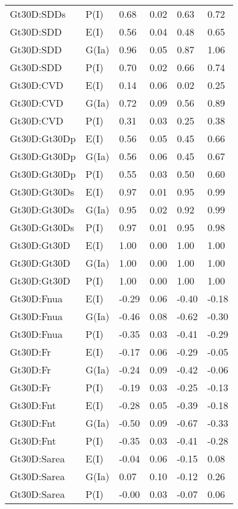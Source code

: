 \begin{center}
\begin{longtable}{|p{1.1in}|p{0.7in}|p{0.7in}|p{0.6in}|p{0.6in}|p{0.6in}|}
  Gt30D:SDDs & P(I) & 0.68 & 0.02 & 0.63 & 0.72 \\ 
  Gt30D:SDD & E(I) & 0.56 & 0.04 & 0.48 & 0.65 \\ 
  Gt30D:SDD & G(Ia) & 0.96 & 0.05 & 0.87 & 1.06 \\ 
  Gt30D:SDD & P(I) & 0.70 & 0.02 & 0.66 & 0.74 \\ 
  Gt30D:CVD & E(I) & 0.14 & 0.06 & 0.02 & 0.25 \\ 
  Gt30D:CVD & G(Ia) & 0.72 & 0.09 & 0.56 & 0.89 \\ 
  Gt30D:CVD & P(I) & 0.31 & 0.03 & 0.25 & 0.38 \\ 
  Gt30D:Gt30Dp & E(I) & 0.56 & 0.05 & 0.45 & 0.66 \\ 
  Gt30D:Gt30Dp & G(Ia) & 0.56 & 0.06 & 0.45 & 0.67 \\ 
  Gt30D:Gt30Dp & P(I) & 0.55 & 0.03 & 0.50 & 0.60 \\ 
  Gt30D:Gt30Ds & E(I) & 0.97 & 0.01 & 0.95 & 0.99 \\ 
  Gt30D:Gt30Ds & G(Ia) & 0.95 & 0.02 & 0.92 & 0.99 \\ 
  Gt30D:Gt30Ds & P(I) & 0.97 & 0.01 & 0.95 & 0.98 \\ 
  Gt30D:Gt30D & E(I) & 1.00 & 0.00 & 1.00 & 1.00 \\ 
  Gt30D:Gt30D & G(Ia) & 1.00 & 0.00 & 1.00 & 1.00 \\ 
  Gt30D:Gt30D & P(I) & 1.00 & 0.00 & 1.00 & 1.00 \\ 
  Gt30D:Fnua & E(I) & -0.29 & 0.06 & -0.40 & -0.18 \\ 
  Gt30D:Fnua & G(Ia) & -0.46 & 0.08 & -0.62 & -0.30 \\ 
  Gt30D:Fnua & P(I) & -0.35 & 0.03 & -0.41 & -0.29 \\ 
  Gt30D:Fr & E(I) & -0.17 & 0.06 & -0.29 & -0.05 \\ 
  Gt30D:Fr & G(Ia) & -0.24 & 0.09 & -0.42 & -0.06 \\ 
  Gt30D:Fr & P(I) & -0.19 & 0.03 & -0.25 & -0.13 \\ 
  Gt30D:Fnt & E(I) & -0.28 & 0.05 & -0.39 & -0.18 \\ 
  Gt30D:Fnt & G(Ia) & -0.50 & 0.09 & -0.67 & -0.33 \\ 
  Gt30D:Fnt & P(I) & -0.35 & 0.03 & -0.41 & -0.28 \\ 
  Gt30D:Sarea & E(I) & -0.04 & 0.06 & -0.15 & 0.08 \\ 
  Gt30D:Sarea & G(Ia) & 0.07 & 0.10 & -0.12 & 0.26 \\ 
  Gt30D:Sarea & P(I) & -0.00 & 0.03 & -0.07 & 0.06 \\ 

\end{longtable}
\end{center}
